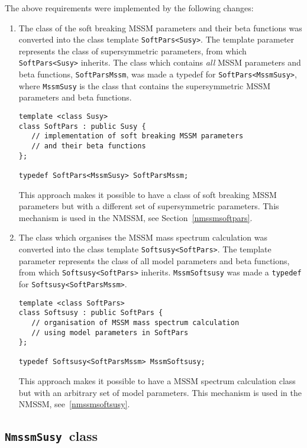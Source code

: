 \documentclass[final,3p,times,pdflatex]{elsarticle}
\def\code#1{\small{\tt #1}\normalsize}
\begin{document}
The above requirements were implemented by the following changes:
%
\begin{enumerate}
\item The class of the soft breaking MSSM parameters and their beta
  functions was converted into the class template \code{SoftPars<Susy>}.
  The template parameter represents the class of supersymmetric
  parameters, from which \code{SoftPars<Susy>} inherits.  The class
  which contains \emph{all} MSSM parameters and beta functions,
  \code{SoftParsMssm}, was made a typedef for
  \code{SoftPars<MssmSusy>}, where \code{MssmSusy} is the class that
  contains the supersymmetric MSSM parameters and beta functions.
\begin{verbatim}
template <class Susy>
class SoftPars : public Susy {
   // implementation of soft breaking MSSM parameters
   // and their beta functions
};

typedef SoftPars<MssmSusy> SoftParsMssm;
\end{verbatim}
  This approach makes it possible to have a class of soft breaking
  MSSM parameters but with a different set of supersymmetric
  parameters.  This mechanism is used in the NMSSM, see
  Section~\ref{nmssmsoftpars}. 

\item The class which organises the MSSM mass spectrum calculation was
  converted into the class template \code{Softsusy<SoftPars>}.  The
  template parameter represents the class of all model parameters and
  beta functions, from which \code{Softsusy<SoftPars>} inherits.
  \code{MssmSoftsusy} was made a \code{typedef} for
  \code{Softsusy<SoftParsMssm>}.
\begin{verbatim}
template <class SoftPars>
class Softsusy : public SoftPars {
   // organisation of MSSM mass spectrum calculation
   // using model parameters in SoftPars
};

typedef Softsusy<SoftParsMssm> MssmSoftsusy;
\end{verbatim}
  This approach makes it possible to have a MSSM spectrum calculation
  class but with an arbitrary set of model parameters.  This mechanism
  is used in the NMSSM, see~\ref{nmssmsoftsusy}.
\end{enumerate}

\subsection{\code{NmssmSusy}~class}
\label{nmssmsusy}
\end{document}
